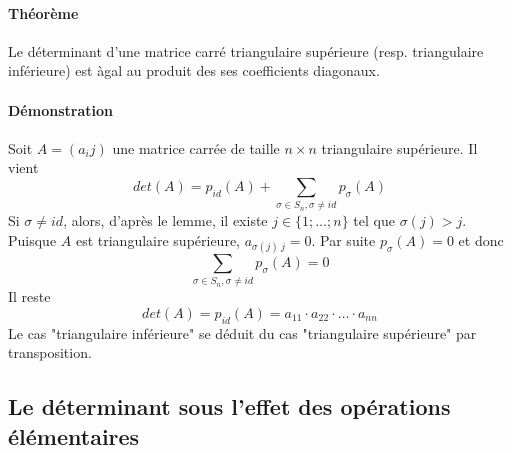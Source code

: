 \paragraph{Théorème} Le déterminant d'une matrice carré triangulaire supérieure (resp. triangulaire inférieure) est àgal au produit des ses coefficients diagonaux.

\paragraph{Démonstration}  Soit $A = (a_ij)$ une matrice carrée de taille $n \times n$ triangulaire supérieure. Il vient 
$$det(A) = p_{id}(A) + \sum_{\sigma \in S_n, \sigma \neq id} p_{\sigma}(A)$$
Si $\sigma \neq id$, alors, d'après le lemme, il existe $j \in \{1; \ldots; n \}$ tel que $\sigma(j) > j$. Puisque $A$ est triangulaire supérieure, $a_{\sigma(j) ~ j} = 0$. Par suite $p_{\sigma}(A) = 0$ et donc 
$$\sum_{\sigma \in S_n, \sigma \neq id} p_{\sigma}(A) = 0$$
Il reste
$$det(A) = p_{id}(A) = a_{11} \cdot a_{22} \cdot \ldots \cdot a_{nn}$$
Le cas "triangulaire inférieure" se déduit du cas "triangulaire supérieure" par transposition.

%
\subsection{Le déterminant sous l'effet des opérations élémentaires}
%
